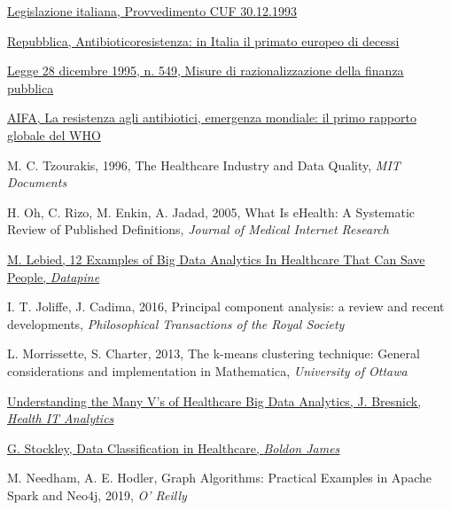 \begin{thebibliography}{}
	\href{http://www.fcr.re.it/classificazione-dei-farmaci-ai-fini-della-rimborsabilita}{Legislazione italiana, Provvedimento CUF 30.12.1993}
	
	\href{https://www.repubblica.it/salute/medicina-e-ricerca/2019/03/13/news/antibioticoresistenza\_in\_italia\_il\_primato\_europeo\_di\_decessi-221467306/}{Repubblica, Antibioticoresistenza: in Italia il primato europeo di decessi}
	
	\href{https://www.normattiva.it/uri-res/N2Ls?urn:nir:stato:legge:1995-12-29;549~art3!vig=}{Legge 28 dicembre 1995, n. 549, Misure di razionalizzazione della finanza pubblica}
	
	\href{http://www.agenziafarmaco.gov.it/content/la-resistenza-agli-antibiotici-emergenza-mondiale-il-primo-rapporto-globale-del-who}{AIFA, La resistenza agli antibiotici, emergenza mondiale: il primo rapporto globale del WHO}
	
	M. C. Tzourakis, 1996, The Healthcare Industry and Data Quality, \textit{MIT Documents}
	
	H. Oh, C. Rizo, M. Enkin, A. Jadad, 2005, What Is eHealth: A Systematic Review of Published Definitions, \textit{Journal of Medical Internet Research}
	
	\href{https://www.datapine.com/blog/big-data-examples-in-healthcare/}{M. Lebied, 12 Examples of Big Data Analytics In Healthcare That Can Save People, \textit{Datapine}}
	
	I. T. Joliffe, J. Cadima, 2016, Principal component analysis: a review and recent developments, \textit{Philosophical Transactions of the Royal Society}
	
	L. Morrissette, S. Charter, 2013, The k-means clustering technique: General considerations and implementation in Mathematica, \textit{University of Ottawa}
	
	\href{https://healthitanalytics.com/news/understanding-the-many-vs-of-healthcare-big-data-analytics}{Understanding the Many V’s of Healthcare Big Data Analytics, J. Bresnick, \textit{Health IT Analytics}}
	
	\href{https://www.boldonjames.com/blog/data-classification-in-healthcare/}{G. Stockley, Data Classification in Healthcare, \textit{Boldon James}}

	M. Needham, A. E. Hodler, Graph Algorithms: Practical Examples in Apache Spark and Neo4j, 2019, \textit{O' Reilly}
	

\end{thebibliography}
